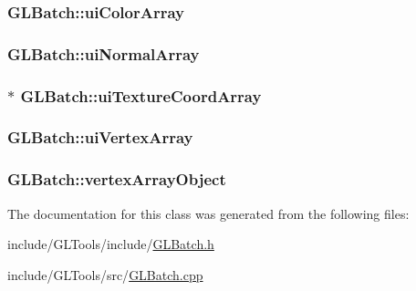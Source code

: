 \hypertarget{class_g_l_batch_ad22c19206d37e8a20156f515e1196992}{
\subsubsection[{ui\-Color\-Array}]{ G\-L\-Batch\-::ui\-Color\-Array\hspace{0.3cm}{\ttfamily [protected]}}}\label{class_g_l_batch_ad22c19206d37e8a20156f515e1196992}
\hypertarget{class_g_l_batch_ab6684b968df5b71a844d1e4ae5d32c81}{
\subsubsection[{ui\-Normal\-Array}]{ G\-L\-Batch\-::ui\-Normal\-Array\hspace{0.3cm}{\ttfamily [protected]}}}\label{class_g_l_batch_ab6684b968df5b71a844d1e4ae5d32c81}
\hypertarget{class_g_l_batch_a5238f4fa96b4b26d3d037770b6e83966}{
\subsubsection[{ui\-Texture\-Coord\-Array}]{$\ast$ G\-L\-Batch\-::ui\-Texture\-Coord\-Array\hspace{0.3cm}{\ttfamily [protected]}}}\label{class_g_l_batch_a5238f4fa96b4b26d3d037770b6e83966}
\hypertarget{class_g_l_batch_a9b28fb6e5aefa2e523252dd85ffded3c}{
\subsubsection[{ui\-Vertex\-Array}]{ G\-L\-Batch\-::ui\-Vertex\-Array\hspace{0.3cm}{\ttfamily [protected]}}}\label{class_g_l_batch_a9b28fb6e5aefa2e523252dd85ffded3c}
\hypertarget{class_g_l_batch_addb43b74e88b3e64728be8c16411fd9f}{
\subsubsection[{vertex\-Array\-Object}]{ G\-L\-Batch\-::vertex\-Array\-Object\hspace{0.3cm}{\ttfamily [protected]}}}\label{class_g_l_batch_addb43b74e88b3e64728be8c16411fd9f}


The documentation for this class was generated from the following files\-:\begin{DoxyCompactItemize}
\item 
include/\-G\-L\-Tools/include/\hyperlink{_g_l_batch_8h}{G\-L\-Batch.\-h}\item 
include/\-G\-L\-Tools/src/\hyperlink{_g_l_batch_8cpp}{G\-L\-Batch.\-cpp}\end{DoxyCompactItemize}
